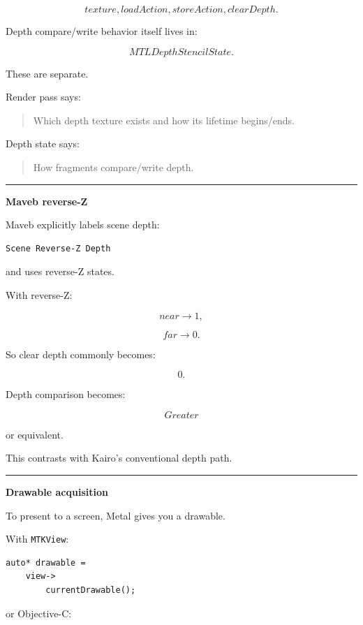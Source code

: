 \[
texture,
loadAction,
storeAction,
clearDepth.
\]

Depth compare/write behavior itself lives in:

\[
MTLDepthStencilState.
\]

These are separate.

Render pass says:

\begin{quote}
Which depth texture exists and how its lifetime begins/ends.
\end{quote}

Depth state says:

\begin{quote}
How fragments compare/write depth.
\end{quote}

\begin{center}\rule{0.5\linewidth}{0.5pt}\end{center}

\textbf{Maveb reverse-Z}

Maveb explicitly labels scene depth:

\begin{verbatim}
Scene Reverse-Z Depth
\end{verbatim}

and uses reverse-Z states.

With reverse-Z:

\[
near\rightarrow1,
\]

\[
far\rightarrow0.
\]

So clear depth commonly becomes:

\[
0.
\]

Depth comparison becomes:

\[
Greater
\]

or equivalent.

This contrasts with Kairo's conventional depth path.

\begin{center}\rule{0.5\linewidth}{0.5pt}\end{center}

\textbf{Drawable acquisition}

To present to a screen, Metal gives you a drawable.

With \texttt{MTKView}:

\begin{verbatim}
auto* drawable =
    view->
        currentDrawable();
\end{verbatim}

or Objective-C:

